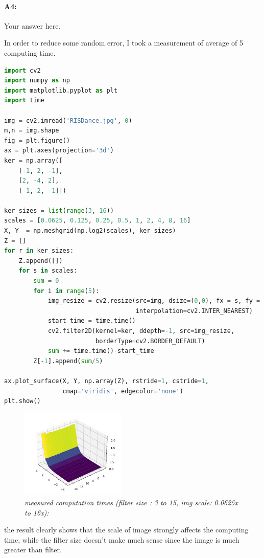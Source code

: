 	\paragraph{A4:} Your answer here.

 	In order to reduce some random error, I took a measurement of average of 5 computing time.
	\begin{lstlisting}[language=Python]
import cv2
import numpy as np
import matplotlib.pyplot as plt
import time

img = cv2.imread('RISDance.jpg', 0)
m,n = img.shape
fig = plt.figure()
ax = plt.axes(projection='3d')
ker = np.array([
    [-1, 2, -1],
    [2, -4, 2],
    [-1, 2, -1]])

ker_sizes = list(range(3, 16))
scales = [0.0625, 0.125, 0.25, 0.5, 1, 2, 4, 8, 16]
X, Y  = np.meshgrid(np.log2(scales), ker_sizes)
Z = []
for r in ker_sizes:
    Z.append([])
    for s in scales:
        sum = 0
        for i in range(5):
            img_resize = cv2.resize(src=img, dsize=(0,0), fx = s, fy = s,
                                    interpolation=cv2.INTER_NEAREST)
            start_time = time.time()
            cv2.filter2D(kernel=ker, ddepth=-1, src=img_resize,
                         borderType=cv2.BORDER_DEFAULT)
            sum += time.time()-start_time
        Z[-1].append(sum/5)

ax.plot_surface(X, Y, np.array(Z), rstride=1, cstride=1,
                cmap='viridis', edgecolor='none')
plt.show()
	\end{lstlisting}

	\begin{figure}[h!]
	    \centering
	    \includegraphics[width=5cm]{question4_plot.png}
	    \caption{\emph{measured computation times (filter size : 3 to 15, img scale: 0.0625x to 16x):}}
	    \label{fig:result5}
	\end{figure}
	the result clearly shows that the scale of image strongly affects the computing time, while the filter size doesn't make much sense since the image is much greater than filter.
	
	\pagebreak
	
	
	
	
